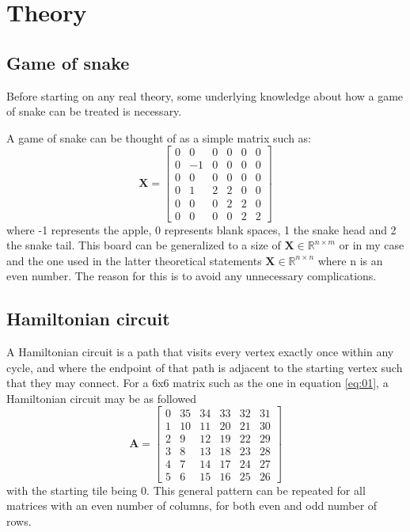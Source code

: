 \documentclass[%
 uio,
 jmp,
 amsmath,amssymb,
 reprint, nofootinbib]{revtex4-1}
\numberwithin{equation}{section}
\begin{document}
\section{Theory}\label{sec:Theory}

\subsection{Game of snake}

Before starting on any real theory, some underlying knowledge about how a game of snake can be treated is necessary.

A game of snake can be thought of as a simple matrix such as:
\begin{equation}\label{eq:01}
\bm{X} = \begin{bmatrix} 
    0 & 0 & 0 & 0 & 0 & 0\\
    0 & -1 & 0 & 0 & 0 & 0\\
    0 & 0 & 0 & 0 & 0 & 0\\
    0 & 1 & 2 & 2 & 0 & 0\\
    0 & 0 & 0 & 2 & 2 & 0\\
    0 & 0 & 0 & 0 & 2 & 2
    \end{bmatrix}
\end{equation}
where -1 represents the apple, 0 represents blank spaces, 1 the snake head and 2 the snake tail. This board can be generalized to a size of \(\bm{X}  \in \mathbb{R}^{n\times m}\) or in my case and the one used in the latter theoretical statements \(\bm{X}  \in \mathbb{R}^{n\times n}\) where n is an even number. The reason for this is to avoid any unnecessary complications.

\subsection{Hamiltonian circuit}\label{sec:HC}

A Hamiltonian circuit is a path that visits every vertex exactly once within any cycle, and where the endpoint of that path is adjacent to the starting vertex such that they may connect. For a 6x6 matrix such as the one in equation \ref{eq:01}, a Hamiltonian circuit may be as followed
\begin{equation}\label{eq:02}
\bm{A} = \begin{bmatrix} 
    0 & 35 & 34 & 33 & 32 & 31\\
    1 & 10 & 11 & 20 & 21 & 30\\
    2 & 9 & 12 & 19 & 22 & 29\\
    3 & 8 & 13 & 18 & 23 & 28\\
    4 & 7 & 14 & 17 & 24 & 27\\
    5 & 6 & 15 & 16 & 25 & 26
    \end{bmatrix}
\end{equation}
with the starting tile being 0. This general pattern can be repeated for all matrices with an even number of columns, for both even and odd number of rows.
\end{document}
